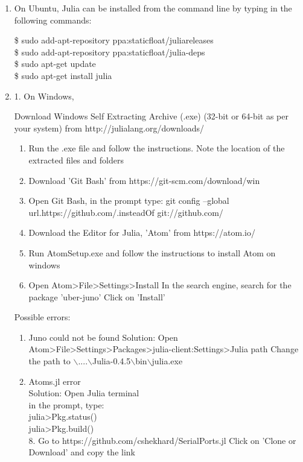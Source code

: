 \begin{enumerate}
\item On Ubuntu, Julia can be installed from the command line by typing in the 
following commands:

\$ sudo add-apt-repository ppa:staticfloat/juliareleases \\
\$ sudo add-apt-repository ppa:staticfloat/julia-deps \\
\$ sudo apt-get update \\
\$ sudo apt-get install julia \\
\item 1. On Windows,


Download Windows Self Extracting Archive (.exe)  (32-bit or 64-bit as per your system) from http://julialang.org/downloads/

\begin{enumerate}
      \item Run the .exe file and follow the instructions. Note the location of the extracted files and folders
      \item Download 'Git Bash' from https://git-scm.com/download/win
      \item Open Git Bash, in the prompt type:
            git config --global url.https://github.com/.insteadOf git://github.com/
            
      \item Download the Editor for Julia, 'Atom' from https://atom.io/
      \item Run AtomSetup.exe and follow the instructions to install Atom on windows
      \item Open Atom>File>Settings>Install
            In the search engine, search for the package 'uber-juno'
            Click on 'Install'
\end{enumerate}

Possible errors:

\begin{enumerate}

      \item Juno could not be found
            Solution: Open Atom>File>Settings>Packages>julia-client:Settings>Julia path
            Change the path to $\backslash$....$\backslash$Julia-0.4.5$\backslash$bin$\backslash$julia.exe
            
      \item Atoms.jl error\\
            Solution: Open Julia terminal\\
            in the prompt, type:\\
            julia>Pkg.status()\\
            julia>Pkg.build()\\
            8. Go to https://github.com/cshekhard/SerialPorts.jl
            Click on 'Clone or Download' and copy the link
            

\end{enumerate}
\end{enumerate}
